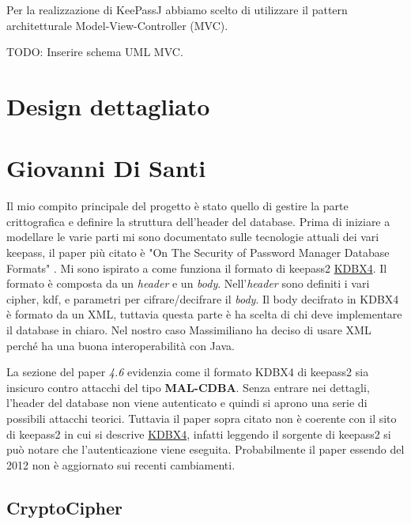 \documentclass[a4paper,12pt]{report}
\begin{document}
Per la realizzazione di KeePassJ abbiamo scelto di utilizzare il pattern architetturale
Model-View-Controller (MVC).

TODO: Inserire schema UML MVC.

\section{Design dettagliato}

\section*{Giovanni Di Santi}

Il mio compito principale del progetto è stato quello di gestire la parte crittografica e
definire la struttura dell'header del database. 
Prima di iniziare a modellare le varie parti mi sono documentato sulle tecnologie attuali dei vari keepass,
il paper più citato è "On The Security of Password Manager Database Formats" \cite{security}.
Mi sono ispirato a come funziona il formato di keepass2 \href{https://keepass.info/help/kb/kdbx_4.html}{KDBX4}.
Il formato è composta da un \textit{header} e un \textit{body}.
Nell'\textit{header} sono definiti i vari cipher, kdf, e parametri per cifrare/decifrare
il \textit{body}. Il body decifrato in KDBX4 è formato da un XML, tuttavia questa parte è ha scelta
di chi deve implementare il database in chiaro. Nel nostro caso Massimiliano ha
deciso di usare XML perché ha una buona interoperabilità con Java.

La sezione del paper \textit{4.6} evidenzia come il formato KDBX4 di keepass2 sia
insicuro contro attacchi del tipo \textbf{MAL-CDBA}. Senza entrare nei dettagli,
l'header del database non viene autenticato e quindi si aprono una serie di possibili
attacchi teorici.
Tuttavia il paper sopra citato non è coerente con il sito di keepass2 in cui si descrive
\href{https://keepass.info/help/kb/kdbx_4.html}{KDBX4}, infatti leggendo il sorgente di
keepass2 si può notare che l'autenticazione viene eseguita. Probabilmente il paper
essendo del 2012 non è aggiornato sui recenti cambiamenti.

\subsection*{CryptoCipher}
\end{document}
